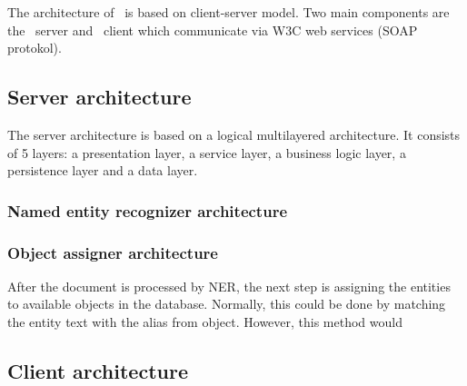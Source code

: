 

The architecture of \textan\ is based on client-server model. Two main components
are the \textan\ server and \textan\ client which communicate via W3C web services
(SOAP protokol).

\subsection{Server architecture}

The server architecture is based on a logical multilayered architecture. It
consists of 5 layers: a presentation layer, a service layer, a business logic layer, 
a persistence layer and a data layer.




\subsubsection{Named entity recognizer architecture}


\subsubsection{Object assigner architecture} %


After the document is processed by NER, the next step is assigning the entities to available objects in the database. 
Normally, this could be done by matching the entity text with the alias from object. However, this method would 


\subsection{Client architecture}


